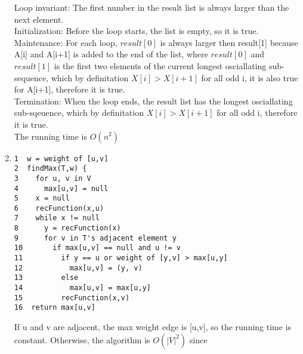 \documentclass{article}
\begin{document}
\begin{enumerate}
Loop invariant: The first number in the result list is always larger than the next element. \\
Initialization: Before the loop starts, the list is empty, so it is true. \\
Maintenance: For each loop, $result[0]$ is always larger then result[1] because A[i] and A[i+1] is added to the end of the list, where $result[0]$ and $result[1]$ is the first two elements of the current longest osciallating sub-sequence, which by definitation $X[i] > X[i+1]$ for all odd i, it is also true for A[i+1], therefore it is true. \\
Termination: When the loop ends, the result list has the longest osciallating sub-sqeuence, which by definitation $X[i] > X[i+1]$ for all odd i, therefore it is true. \\
The running time is $O(n^2)$

\item
\begin{verbatim}
1  w = weight of [u,v]
2  findMax(T,w) {
3    for u, v in V
4      max[u,v] = null
5    x = null
6    recFunction(x,u)
7    while x != null
8      y = recFunction(x)
9      for v in T's adjacent element y
10       if max[u,v] == null and u != v
11         if y == u or weight of [y,v] > max[u,y]
12           max[u,v] = (y, v)
13         else
14           max[u,v] = max[u,y]
15         recFunction(x,v)
16  return max[u,v]
\end{verbatim}
If u and v are adjacent, the max weight edge is [u,v], so the running time is constant. Otherwise, the algorithm is $O(|V|^2)$ since 

\end{enumerate}
\end{document}
